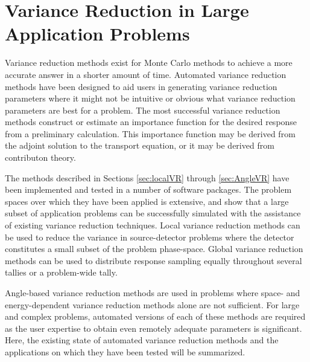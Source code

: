 \section{Variance Reduction in Large Application Problems}
\label{sec:litsummary}

Variance reduction methods exist for Monte Carlo methods to
achieve a more accurate answer in a
shorter amount of time. Automated variance reduction methods have been designed
to aid users in generating variance reduction parameters where it might not be
intuitive or obvious what variance reduction parameters are best for a problem.
The most successful variance reduction methods construct or estimate an
importance function for the desired response from a preliminary calculation.
This importance function may be derived from the adjoint solution to the
transport equation, or it may be derived from contributon theory.

The methods described in Sections \ref{sec:localVR} through \ref{sec:AngleVR}
have been implemented and tested in a number of software packages. The problem
spaces over which they have been applied is extensive, and show that a large
subset of application problems can be successfully simulated with the assistance
of existing variance reduction techniques. Local variance reduction methods can
be used to reduce the variance in source-detector problems where the detector
constitutes a small subset of the problem phase-space. Global variance reduction
methods can be used to distribute response sampling equally throughout several tallies
or a problem-wide tally. 

Angle-based variance reduction methods are used in
problems where space- and energy-dependent variance reduction methods alone are not
sufficient. For large and complex problems, automated versions of each of these
methods are required as the user expertise to obtain even remotely adequate
parameters is significant. Here, the existing state of automated variance
reduction methods and the applications on which they have been tested will be
summarized.

